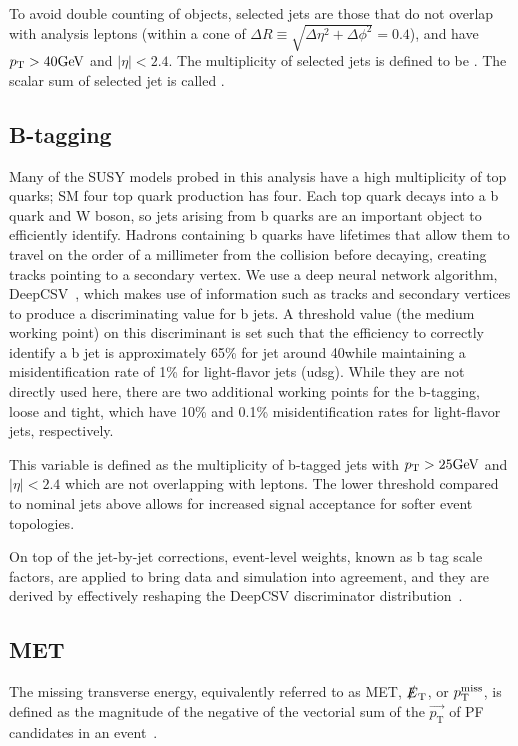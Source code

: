 To avoid double counting of objects,
selected jets are those that do not overlap with analysis leptons 
(within a cone of $\Delta R \equiv \sqrt{\Delta\eta^2 + \Delta\phi^2} = 0.4$),
and have $p_{\mathrm{T}}>40\text{GeV}$ and $|\eta|<2.4$. The multiplicity of selected jets
is defined to be \Njets. The scalar sum of selected jet \pt
is called \HT.

\subsection{B-tagging}
Many of the SUSY models probed in this analysis have a high multiplicity of
top quarks; SM four top quark production has four. Each top quark decays into
a b quark and W boson, so jets arising from b quarks are an important object
to efficiently identify. Hadrons containing b quarks have lifetimes that
allow them to travel on the order of a millimeter from the collision before
decaying, creating tracks pointing to a secondary vertex. We use a deep
neural network algorithm, DeepCSV~\cite{CMS:Sirunyan2017ezt}, which makes use
of information such as tracks and secondary vertices to produce a
discriminating value for b jets. A threshold value (the medium working point)
on this discriminant is set such that the efficiency to correctly identify a
b jet is approximately 65\% for jet \pt around 40\GeV while maintaining a
misidentification rate of 1\% for light-flavor jets (udsg).
While they are not directly used here, there are two additional working points
for the b-tagging, loose and tight, which have 10\% and 0.1\% misidentification 
rates for light-flavor jets, respectively.

This \Nbjets variable is defined as the multiplicity 
of b-tagged jets with $p_{\mathrm{T}}>25\text{GeV}$ and $|\eta|<2.4$ which are
not overlapping with leptons. The lower threshold compared
to nominal jets above allows for increased signal acceptance for softer event
topologies.

On top of the jet-by-jet corrections, event-level weights, known as 
b tag scale factors, are applied to bring data and simulation \Nbjets into agreement,
and they are derived by effectively reshaping the DeepCSV discriminator
distribution~\cite{CMS:BtagSF}.

\subsection{MET}

The missing transverse energy,
equivalently referred to as MET, $\slashed{E}_\mathrm{T}$, or $p_{\mathrm{T}}^\text{miss}$, is defined
as the magnitude of the negative of the vectorial sum of the $\vec{p_\mathrm{T}}$ of PF candidates in an
event~\cite{CMS:Sirunyan2019kia}.

